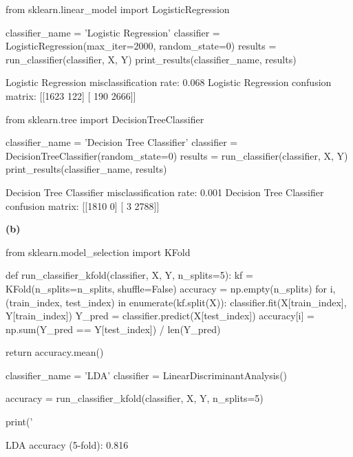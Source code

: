 \begin{python}
from sklearn.linear_model import LogisticRegression

classifier_name = 'Logistic Regression'
classifier = LogisticRegression(max_iter=2000, random_state=0)
results = run_classifier(classifier, X, Y)
print_results(classifier_name, results)
\end{python}

\begin{console}
Logistic Regression misclassification rate: 0.068
Logistic Regression confusion matrix:
[[1623  122]
 [ 190 2666]]
\end{console}

\begin{python}
from sklearn.tree import DecisionTreeClassifier

classifier_name = 'Decision Tree Classifier'
classifier = DecisionTreeClassifier(random_state=0)
results = run_classifier(classifier, X, Y)
print_results(classifier_name, results)
\end{python}

\begin{console}
Decision Tree Classifier misclassification rate: 0.001
Decision Tree Classifier confusion matrix:
[[1810    0]
 [   3 2788]]
\end{console}

\textbf{(b)}

\begin{python}
from sklearn.model_selection import KFold

def run_classifier_kfold(classifier, X, Y, n_splits=5):
    kf = KFold(n_splits=n_splits, shuffle=False)
    accuracy = np.empty(n_splits)
    for i, (train_index, test_index) in enumerate(kf.split(X)):
        classifier.fit(X[train_index], Y[train_index])
        Y_pred = classifier.predict(X[test_index])
        accuracy[i] = np.sum(Y_pred == Y[test_index]) / len(Y_pred)
    
    return accuracy.mean()
\end{python}

\begin{python}
classifier_name = 'LDA'
classifier = LinearDiscriminantAnalysis()

accuracy = run_classifier_kfold(classifier, X, Y, n_splits=5)

print('%
\end{python}

\begin{console}
LDA accuracy (5-fold): 0.816
\end{console}


